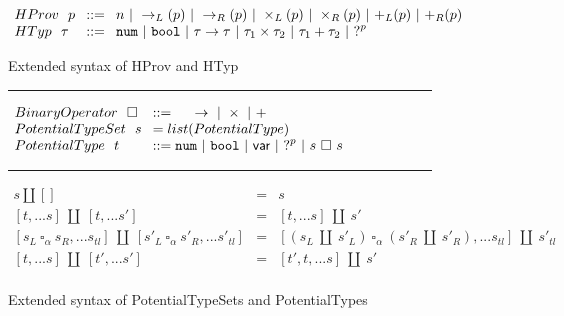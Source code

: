 
\begin{figure}[h!]
\centering
$\arraycolsep=4pt\begin{array}{lll}
HProv~~ p & ::= & 
    n ~\vert~ 
    \rightarrow_{L}(p) ~\vert~ 
    \rightarrow_{R}(p) ~\vert~ 
    \times_{L}(p) ~\vert~ 
    \times_{R}(p) ~\vert~ 
    \mathtt{+}_{L}(p) ~\vert~ 
    \mathtt{+}_{R}(p)
    \\
HTyp~~ \tau & ::= &
  \tnum ~\vert~
  \tbool ~\vert~
  \tarr{\tau}{\tau} ~\vert~
  \tau_1 \times \tau_2 ~\vert~
  \tau_1 + \tau_2 ~\vert~
  \tehole^p
  \\
\end{array}$
\label{fig:syntax_possible_type_sets}
\caption{Extended syntax of HProv and HTyp}
\hrule
$\arraycolsep=4pt\begin{array}{lll}
BinaryOperator~~ \square & ::=~~~~~
\rightarrow  ~\vert~ 
\times  ~\vert~ 
\mathtt{+}
\\
PotentialTypeSet~~ s & = list(PotentialType)
\\
PotentialType~~ t & ::= 
  \tnum ~\vert~
  \tbool ~\vert~
  \TVar ~\vert~
  \tehole^p ~\vert~
  s ~\square~ s
  \\
\end{array}$
\label{fig:syntax_possible_type_sets}
\caption{Extended syntax of PotentialTypeSets and PotentialTypes}
\vspace{5px}
\hrule
\[\begin{array}{rcl}
    s \amalg [] & = & s \\
    \left[t,...s\right] ~\amalg~ \left[t,...s'\right] & = & \left[t,...s\right] ~\amalg~ s' \\
    \left[s_L ~ \square_{\alpha} ~ s_R,...s_{tl}\right] ~\amalg~ \left[s'_L ~ \square_{\alpha} ~ s'_R,...s'_{tl}\right] & = & \left[(s_L ~\amalg~ s'_L) ~ \square_{\alpha} ~ (s'_R ~\amalg~ s'_R),...s_{tl}\right] ~\amalg~ s'_{tl} \\
    \left[t,...s\right] ~\amalg~ \left[t',...s'\right] & = & \left[t',t,...s\right] ~\amalg~ s' \\


\end{array}\]
\end{figure}
